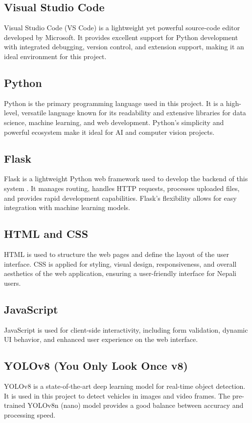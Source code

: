 \documentclass[12pt,a4paper]{report}
\begin{document}
\subsection{Visual Studio Code}
Visual Studio Code (VS Code) is a lightweight yet powerful source-code editor developed by Microsoft. It provides excellent support for Python development with integrated debugging, version control, and extension support, making it an ideal environment for this project.

\subsection{Python}
Python is the primary programming language used in this project. It is a high-level, versatile language known for its readability and extensive libraries for data science, machine learning, and web development. Python's simplicity and powerful ecosystem make it ideal for AI and computer vision projects.

\subsection{Flask}
Flask is a lightweight Python web framework used to develop the backend of this system \cite{flask2023}. It manages routing, handles HTTP requests, processes uploaded files, and provides rapid development capabilities. Flask's flexibility allows for easy integration with machine learning models.

\subsection{HTML and CSS}
HTML is used to structure the web pages and define the layout of the user interface. CSS is applied for styling, visual design, responsiveness, and overall aesthetics of the web application, ensuring a user-friendly interface for Nepali users.

\subsection{JavaScript}
JavaScript is used for client-side interactivity, including form validation, dynamic UI behavior, and enhanced user experience on the web interface.

\subsection{YOLOv8 (You Only Look Once v8)}
YOLOv8 \cite{ultralytics2023yolov8} is a state-of-the-art deep learning model for real-time object detection. It is used in this project to detect vehicles in images and video frames. The pre-trained YOLOv8n (nano) model provides a good balance between accuracy and processing speed.
\end{document}
